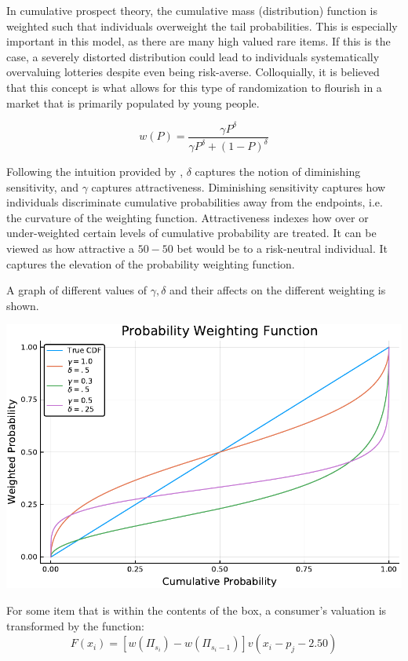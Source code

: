 \documentclass[12pt]{paper}
\newcommand{\brak}[1]{ \left [ #1 \right ] }
\begin{document}
In cumulative prospect theory, the cumulative mass (distribution)
function is weighted such that individuals overweight the tail
probabilities. This is especially important in this model, as there are
many high valued rare items. If this is the case, a severely distorted
distribution could lead to individuals systematically overvaluing
lotteries despite even being risk-averse. Colloquially, it is believed
that this concept is what allows for this type of randomization to
flourish in a market that is primarily populated by young people.

\begin{equation*}
  w(P) = \frac{ \gamma P^\delta }{ \gamma P^\delta + (1-P)^\delta }
\end{equation*}

Following the intuition provided by \cite{GONZALEZ1999129}, $\delta$
captures the notion of diminishing sensitivity,
and $\gamma$ captures attractiveness. Diminishing sensitivity captures how
individuals discriminate cumulative probabilities away from the
endpoints, i.e. the curvature of the weighting
function. Attractiveness indexes how over or under-weighted certain
levels of cumulative probability are treated. It can be viewed as how
attractive a $50-50$ bet would be to a risk-neutral individual. It
captures the elevation of the probability weighting function.

A graph of different values of $\gamma,\delta$ and their affects on the
different weighting is shown. 

\begin{center}
\includegraphics[width=.75\linewidth]{../Plots/WeightFun.pdf}
\end{center}




For some item that is within the contents of the box, a consumer's
valuation is transformed by the function:
\begin{equation*}
F(x_i) = \brak{w( \Pi_{s_i}) - w(\Pi_{s_i - 1}) } v( x_i - p_j - 2.50)
\end{equation*}
\end{document}

